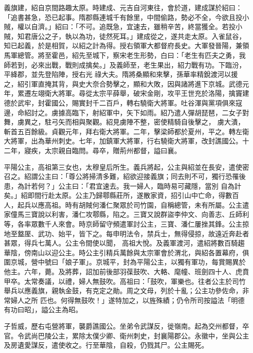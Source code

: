 \begin{pinyinscope}
 義旗建，紹自京間路趣太原。時建成、元吉自河東往，會於道，建成謀於紹曰：「追書甚急，恐已起事。隋郡縣連城千有餘里，中間偷路，勢必不全，今欲且投小賊，權以自濟。」紹曰：「不可。追既急，宜速去，雖稍辛苦，終當獲全。若投小賊，知君唐公之子，執以為功，徒然死耳。」建成從之，遂共走太原。入雀鼠谷，知已起義，於是相賀，以紹之計為得。授右領軍大都督府長史。大軍發晉陽，兼領馬軍總管。將至霍邑，紹先至城下，察宋老生形勢，白曰：「老生有匹夫之勇，我師若到，必來出戰，戰則成擒矣。」及義師至，老生果出，紹力戰有功。下臨汾，平絳郡，並先登陷陣，授右光
 祿大夫。隋將桑顯和來擊，孫華率精銳渡河以援之，紹引軍直掩其背，與史大奈合勢擊之，顯和大敗，因與諸將進下京城。武德元年，累遷左翊衛大將軍。尋從太宗平薛舉，破宋金剛，攻平王世充於洛陽，擒竇建德於武牢，封霍國公，賜實封千二百戶，轉右驍衛大將軍。吐谷渾與黨項俱來寇邊，命紹討之。虜據高臨下，射紹軍中，矢下如雨。紹乃遣人彈胡琵琶，二女子對舞，虜異之，駐弓矢而相與聚觀。紹見虜陣不整，密使精騎自後擊之，
 虜大潰，斬首五百餘級。貞觀元年，拜右衛大將軍。二年，擊梁師都於夏州，平之。轉左衛大將軍，出為華州刺史。七年，加鎮軍大將軍，行右驍衛大將軍，改封譙國公。十二年，寢疾，太宗親自臨問。尋卒，贈荊州都督，謚曰襄。



 平陽公主，高祖第三女也，太穆皇后所生。義兵將起，公主與紹並在長安，遣使密召之。紹謂公主曰：「尊公將掃清多難，紹欲迎接義旗；同去則不可，獨行恐罹後患，為計若何？」公主曰：「君宜速去。我一婦人，臨時易可藏隱，當別
 自為計矣。」紹即間行赴太原。公主乃歸鄠縣莊所，遂散家資，招引山中亡命，得數百人，起兵以應高祖。時有胡賊何潘仁聚眾於司竹園，自稱總管，未有所屬。公主遣家僮馬三寶說以利害，潘仁攻鄠縣，陷之。三寶又說群盜李仲文、向善志、丘師利等，各率眾數千人來會。時京師留守頻遣軍討公主，三寶、潘仁屢挫其鋒。公主掠地至盩厔、武功、始平，皆下之。每申明法令，禁兵士，無得侵掠，故遠近奔赴者甚眾，得兵七萬人。公主令間使以聞，
 高祖大悅。及義軍渡河，遣紹將數百騎趨華陰，傍南山以迎公主。時公主引精兵萬餘與太宗軍會於渭北，與紹各置幕府，俱圍京城，營中號曰「娘子軍」。京城平，封為平陽公主，以獨有軍功，每賞賜異於他主。六年，薨。及將葬，詔加前後部羽葆鼓吹、大輅、麾幢、班劍四十人、虎賁甲卒。太常奏議，以禮，婦人無鼓吹。高祖曰：「鼓吹，軍樂也。往者公主於司竹舉兵以應義旗，親執金鼓，有克定之勛。周之文母，列於十亂；公主功參佐命，非常婦人之所
 匹也。何得無鼓吹！」遂特加之，以旌殊績；仍令所司按謚法「明德有功曰昭」，謚公主為昭。



 子哲威，歷右屯營將軍，襲爵譙國公。坐弟令武謀反，徙嶺南。起為交州都督，卒官。令武尚巴陵公主，累除太僕少卿、衛州刺史，封襄陽郡公。永徽中，坐與公主及房遺愛謀反，遣使收之。行至華陰，自殺，仍戮其尸。公主賜死。




\end{pinyinscope}
